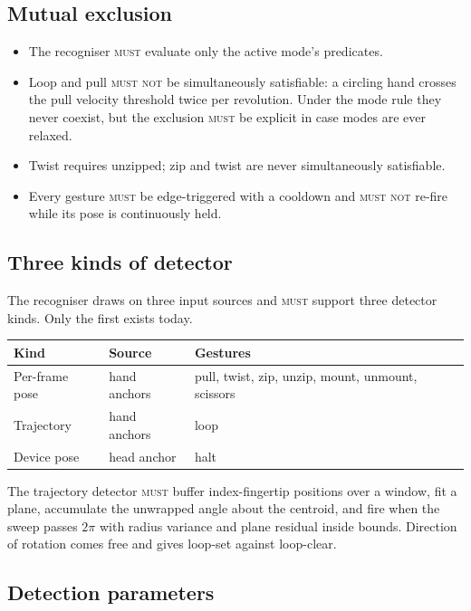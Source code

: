 \documentclass[11pt,a4paper]{article}
\newcommand{\MUST}{\textsc{must}}
\newcommand{\MUSTNOT}{\textsc{must not}}
\theoremstyle{definition}
\theoremstyle{plain}
\theoremstyle{remark}
\begin{document}
\subsection{Mutual exclusion}

\begin{itemize}[leftmargin=*]
\item The recogniser \MUST{} evaluate only the active mode's predicates.
\item Loop and pull \MUSTNOT{} be simultaneously satisfiable: a circling hand crosses the pull
      velocity threshold twice per revolution. Under the mode rule they never coexist, but the
      exclusion \MUST{} be explicit in case modes are ever relaxed.
\item Twist requires unzipped; zip and twist are never simultaneously satisfiable.
\item Every gesture \MUST{} be edge-triggered with a cooldown and \MUSTNOT{} re-fire while its pose
      is continuously held.
\end{itemize}

\subsection{Three kinds of detector}

The recogniser draws on three input sources and \MUST{} support three detector kinds. Only the
first exists today.

\begin{center}
\begin{tabular}{lll}
\toprule
\textbf{Kind} & \textbf{Source} & \textbf{Gestures} \\
\midrule
Per-frame pose  & hand anchors   & pull, twist, zip, unzip, mount, unmount, scissors \\
Trajectory      & hand anchors   & loop \\
Device pose     & head anchor    & halt \\
\bottomrule
\end{tabular}
\end{center}

The trajectory detector \MUST{} buffer index-fingertip positions over a window, fit a plane,
accumulate the unwrapped angle about the centroid, and fire when the sweep passes $2\pi$ with
radius variance and plane residual inside bounds. Direction of rotation comes free and gives
loop-set against loop-clear.

\subsection{Detection parameters}
\end{document}
